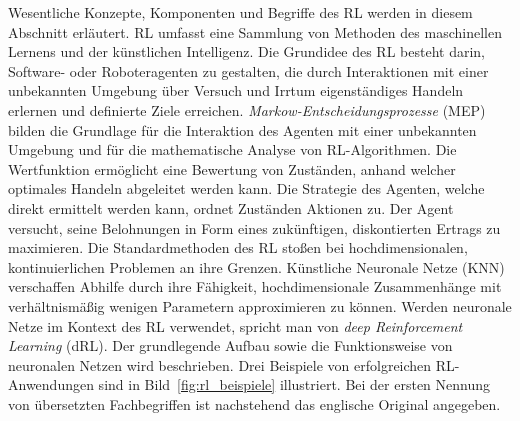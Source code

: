 Wesentliche Konzepte, Komponenten und Begriffe des RL werden in diesem Abschnitt erläutert. RL umfasst eine Sammlung von Methoden des maschinellen Lernens und der künstlichen Intelligenz. Die Grundidee des RL besteht darin, Software- oder Roboteragenten zu gestalten, die durch Interaktionen mit einer unbekannten Umgebung über Versuch und Irrtum eigenständiges Handeln erlernen und definierte Ziele erreichen. \textit{Markow-Entscheidungsprozesse} (MEP) bilden die Grundlage für die Interaktion des Agenten mit einer unbekannten Umgebung und für die mathematische Analyse von RL-Algorithmen. Die Wertfunktion ermöglicht eine Bewertung von Zuständen, anhand welcher optimales Handeln abgeleitet werden kann. Die Strategie des Agenten, welche direkt ermittelt werden kann, ordnet Zuständen Aktionen zu. Der Agent versucht, seine Belohnungen in Form eines zukünftigen, diskontierten Ertrags zu maximieren. Die Standardmethoden des RL stoßen bei hochdimensionalen, kontinuierlichen Problemen an ihre Grenzen. Künstliche Neuronale Netze (KNN) verschaffen Abhilfe durch ihre Fähigkeit, hochdimensionale Zusammenhänge mit verhältnismäßig wenigen Parametern approximieren zu können. Werden neuronale Netze im Kontext des RL verwendet, spricht man von \textit{deep Reinforcement Learning} (dRL). Der grundlegende Aufbau sowie die Funktionsweise von neuronalen Netzen wird beschrieben. Drei Beispiele von erfolgreichen RL-Anwendungen sind in Bild~\ref{fig:rl_beispiele} illustriert. Bei der ersten Nennung von übersetzten Fachbegriffen ist nachstehend das englische Original angegeben. 

